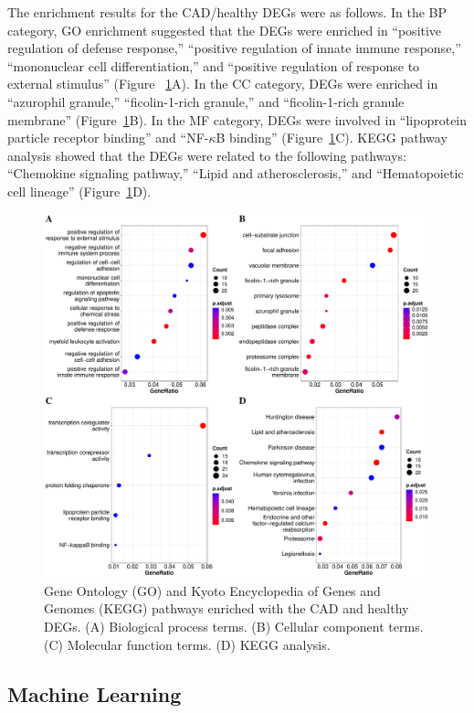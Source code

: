 \documentclass[sn-mathphys,Numbered]{sn-jnl}%
\theoremstyle{thmstyleone}%
\theoremstyle{thmstyletwo}%
\theoremstyle{thmstylethree}%
\begin{document}
The enrichment results for the CAD/healthy DEGs were as follows. In the
BP category, GO enrichment suggested that the DEGs were enriched in
``positive regulation of defense response,'' ``positive regulation of
innate immune response,'' ``mononuclear cell differentiation,'' and
``positive regulation of response to external stimulus'' (Figure
~\ref{fig:CADHEnrich}A). In the CC category, DEGs were enriched in
``azurophil granule,'' ``ficolin-1-rich granule,'' and ``ficolin-1-rich
granule membrane'' (Figure~\ref{fig:CADHEnrich}B). In the MF category,
DEGs were involved in ``lipoprotein particle receptor binding'' and
``NF-$\kappa$B binding'' (Figure~\ref{fig:CADHEnrich}C). KEGG pathway
analysis showed that the DEGs were related to the following pathways:
``Chemokine signaling pathway,'' ``Lipid and atherosclerosis,'' and
``Hematopoietic cell lineage'' (Figure~\ref{fig:CADHEnrich}D).

\begin{figure}
\centering
\includegraphics[width=0.95\linewidth]{Enrichment CAD-Healthy} \caption{Gene Ontology (GO) and Kyoto Encyclopedia of Genes and Genomes (KEGG) pathways enriched with the CAD and healthy DEGs. (A) Biological process terms. (B) Cellular component terms. (C) Molecular function terms. (D) KEGG analysis.}
\label{fig:CADHEnrich}
\end{figure}

\subsection{Machine Learning}\label{machine-learning}
\end{document}
